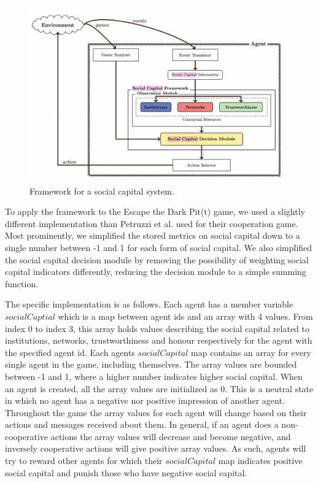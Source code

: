 \begin{figure}[!ht]
    \centering
    \includegraphics[width=0.75\linewidth]{004_team_1_agent_design/images/socialcapitalframework.png}
    \caption{Framework for a social capital system.\cite{pitt}}
    \label{fig:social_capital_framework}
\end{figure}

To apply the framework to the Escape the Dark Pit(t) game, we used a slightly different implementation than Petruzzi et al. used for their cooperation game. Most prominently, we simplified the stored metrics on social capital down to a single number between -1 and 1 for each form of social capital. We also simplified the social capital decision module by removing the possibility of weighting social capital indicators differently, reducing the decision module to a simple summing function. 

The specific implementation is as follows. Each agent has a member variable $socialCaptial$ which is a map between agent ids and an array with 4 values. From index 0 to index 3, this array holds values describing the social capital related to institutions, networks, trustworthiness and honour respectively for the agent with the specified agent id. Each agents $socialCapital$ map contains an array for every single agent in the game, including themselves. The array values are bounded between -1 and 1, where a higher number indicates higher social capital. When an agent is created, all the array values are initialized as 0. This is a neutral state in which no agent has a negative nor positive impression of another agent. Throughout the game the array values for each agent will change based on their actions and messages received about them. In general, if an agent does a non-cooperative actions the array values will decrease and become negative, and inversely cooperative actions will give positive array values. As such, agents will try to reward other agents for which their $socialCapital$ map indicates positive social capital and punish those who have negative social capital.

